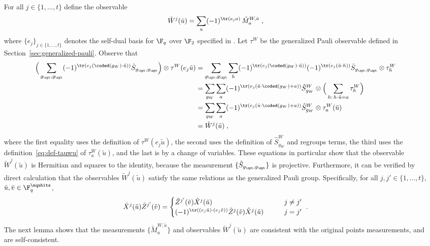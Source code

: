 	For all $j \in \{1,\ldots,t\}$ define the observable
	\begin{equation}\label{eq:def-tildewj}
		\tilde{W}^j(\tilde{u}) = \sum_a (-1)^{\tr(e_j a)} \, \tilde{M}_a^{W,\tilde{u}} \;,
	\end{equation}
	where $\{e_j\}_{j \in \{1,\ldots,t\}}$ denotes the self-dual basis for $\F_q$ over $\F_2$ specified in . Let $\tau^W$ be the generalized Pauli observable defined in Section~\ref{sec:generalized-pauli}. Observe that
	\begin{align*}
	\Big ( \sum_{g_\xpt,g_\zpt} (-1)^{\tr(e_j (\coded(g_W) \cdot \tilde{u}))} \hat{S}_{g_\xpt,g_\zpt} \Big ) \otimes \tau^W(e_j \tilde{u})
	&= \sum_{g_\xpt,g_\zpt} \sum_h (-1)^{\tr(e_j (\coded(g_W) \cdot \tilde{u}))} (-1)^{\tr(e_j(\tilde{u} \cdot h))} \hat{S}_{g_\xpt,g_\zpt} \otimes \tau^W_h\\
	&= \sum_{g_W} \sum_a  (-1)^{\tr(e_j (\tilde{u} \cdot\coded(g_W) + a))} \hat{S}_{g_W}^W \otimes \Big( \sum_{h:\, h\cdot \tilde{u} = a}\tau^W_h\Big)\\
		&= \sum_{g_W} \sum_a  (-1)^{\tr(e_j (\tilde{u} \cdot\coded(g_W) + a))} \hat{S}_{g_W}^W \otimes \tau^W_a(\tilde{u})\\
		&= 		\tilde{W}^j(\tilde{u}) \;,
	\end{align*}
	where the first equality uses the definition of $\tau^W(e_j \tilde{u})$, the second uses the definition of $\hat{S}^W_{g_W}$ and regroups terms, the third uses the definition~\eqref{eq:def-tauwu} of $\tau^W_a(\tilde{u})$, and the last is by a change of variables. These equations in particular show that the observable $\tilde{W}^j(\tilde{u})$ is Hermitian and squares to the identity, because the measurement $\{ \hat{S}_{g_\xpt,g_\zpt} \}$ is projective. 
	Furthermore, it can be verified by direct calculation that the observables $\tilde{W}^j(\tilde{u})$ satisfy the same relations as the generalized Pauli group. Specifically, for all $j,j' \in \{1,\ldots,t\}$, $\tilde{u}, \tilde{v} \in \F_q^\nqubits$,
	\[
		\tilde{X}^j(\tilde{u}) \tilde{Z}^{j'}(\tilde{v}) = \begin{cases}
		\tilde{Z}^{j'}(\tilde{v}) \tilde{X}^j(\tilde{u})  & \qquad j \neq j' \\
		(-1)^{\tr((e_j \tilde{u}) \cdot (e_j \tilde{v}))} \tilde{Z}^{j}(\tilde{v}) \tilde{X}^j(\tilde{u}) & \qquad j = j'
		\end{cases}~.
	\]
	The next lemma shows that the measurements $\{ \tilde{M}^{W,\tilde{u}}_a \}$  and observables $\tilde{W}^j(\tilde{u})$  are consistent with the original points measurements, and are self-consistent. 
	



